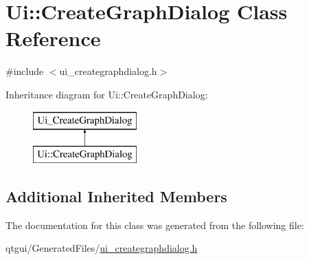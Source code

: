 \hypertarget{class_ui_1_1_create_graph_dialog}{}\section{Ui\+::Create\+Graph\+Dialog Class Reference}
\label{class_ui_1_1_create_graph_dialog}


{\ttfamily \#include $<$ui\+\_\+creategraphdialog.\+h$>$}

Inheritance diagram for Ui\+::Create\+Graph\+Dialog\+:\begin{figure}[H]
\begin{center}
\leavevmode
\includegraphics[height=2.000000cm]{d6/dbf/class_ui_1_1_create_graph_dialog}
\end{center}
\end{figure}
\subsection*{Additional Inherited Members}


The documentation for this class was generated from the following file\+:\begin{DoxyCompactItemize}
\item 
qtgui/\+Generated\+Files/\mbox{\hyperlink{ui__creategraphdialog_8h}{ui\+\_\+creategraphdialog.\+h}}\end{DoxyCompactItemize}
